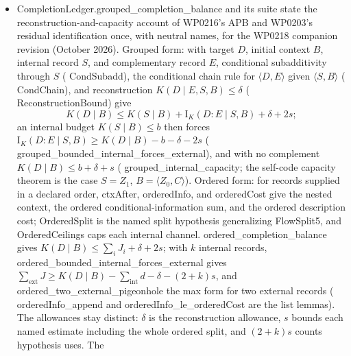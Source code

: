 \documentclass[11pt,a4paper]{article}
\newcommand{\lean}[1]{{\ttfamily\small
  \let\leanunderscore\_\def\_{\leanunderscore\allowbreak}#1}}
\newcommand{\Ik}{\mathrm{I}_K}
\begin{document}
\begin{itemize}[leftmargin=1.4em,itemsep=1pt]
\lean{self\_code\_overload} gives
$K(Z_1\mid Z_0,C)\ge K(\iota\mid Z_0,C)-\delta-s$ by conditional subadditivity.
\lean{bounded\_self\_code\_update\_capacity} uses a conditional update budget
$K(Z_1\mid Z_0,C)\le K_0$ to bound the recoverable novelty by $K_0+\delta+s$;
\lean{bounded\_self\_code\_capacity} instead assumes $K(Z_1)\le K_0$ and
\lean{CondMono}. Finally, \lean{persistence\_does\_not\_imply\_gap} gives a
finite frame witness (\lean{noGapFrame}) with $\mathrm{NMAI}(z,z)=1$,
$\mathrm{NMAI}(z,0^n)=0$, and raw gap $\Delta=K(0^n)-K(z)<0$. This is a witness
in the abstract frame interface; it does not construct an optimal universal
machine realizing those exact assigned complexities.
\item \lean{CompletionLedger.grouped\_completion\_balance} and its suite state the
reconstruction-and-capacity account of WP0216's APB and WP0203's residual identification once,
with neutral names, for the WP0218 companion revision (October 2026). Grouped form: with
target $D$, initial context $B$, internal record $S$, and complementary record $E$,
conditional subadditivity through $S$ (\lean{CondSubadd}), the conditional chain rule for
$\langle D,E\rangle$ given $\langle S,B\rangle$ (\lean{CondChain}), and reconstruction
$K(D\mid E,S,B)\le\delta$ (\lean{ReconstructionBound}) give
\[
 K(D\mid B)\le K(S\mid B)+\Ik(D{:}E\mid S,B)+\delta+2s;
\]
an internal budget $K(S\mid B)\le b$ then forces
$\Ik(D{:}E\mid S,B)\ge K(D\mid B)-b-\delta-2s$
(\lean{grouped\_bounded\_internal\_forces\_external}), and with no complement
$K(D\mid B)\le b+\delta+s$ (\lean{grouped\_internal\_capacity}; the self-code capacity
theorem is the case $S=Z_1$, $B=\langle Z_0,C\rangle$). Ordered form: for records supplied
in a declared order, \lean{ctxAfter}, \lean{orderedInfo}, and \lean{orderedCost} give the
nested context, the ordered conditional-information sum, and the ordered description cost;
\lean{OrderedSplit} is the named split hypothesis generalizing \lean{FlowSplit5}, and
\lean{OrderedCeilings} caps each internal channel. \lean{ordered\_completion\_balance} gives
$K(D\mid B)\le\sum_i J_i+\delta+2s$; with $k$ internal records,
\lean{ordered\_bounded\_internal\_forces\_external} gives
$\sum_{\text{ext}}J\ge K(D\mid B)-\sum_{\text{int}}d-\delta-(2+k)s$, and
\lean{ordered\_two\_external\_pigeonhole} the max form for two external records
(\lean{orderedInfo\_append} and \lean{orderedInfo\_le\_orderedCost} are the list lemmas).
The allowances stay distinct: $\delta$ is the reconstruction allowance, $s$ bounds each named
estimate including the whole ordered split, and $(2+k)s$ counts hypothesis uses. The

\end{itemize}
\end{document}
